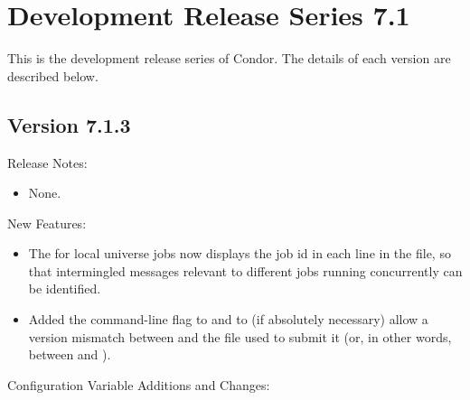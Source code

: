 
\section{\label{sec:History-7-1}Development Release Series 7.1}

This is the development release series of Condor.
The details of each version are described below.


\subsection*{\label{sec:New-7-1-3}Version 7.1.3}

\noindent Release Notes:

\begin{itemize}

\item None.

\end{itemize}


\noindent New Features:

\begin{itemize}

\item The  for local universe jobs now displays the job id
in each line in the file, so that intermingled messages relevant to
different jobs running concurrently can be identified.

\item Added the  command-line flag to
 and  to (if absolutely necessary)
allow a version mismatch between  and the
 file used to submit it (or, in other words, between
 and ).

\end{itemize}

\noindent Configuration Variable Additions and Changes:

